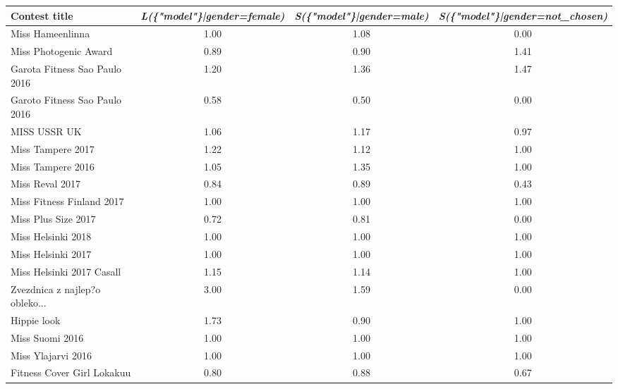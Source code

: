 \documentclass[english]{tktltiki}
\begin{document}
\begin{table}[H]
    \centering
    \begin{adjustbox}{width=1\textwidth}
    \begin{tabular}{lccc}
        \toprule
        \textbf{Contest title} & \textbf{\emph{L(\{"model"\}|gender=female)}} & \textbf{\emph{S(\{"model"\}|gender=male)}} & \textbf{\emph{S(\{"model"\}|gender=not\_chosen)}} \\
        \midrule
                                  Miss Hameenlinna &  1.00 &  1.08 &    0.00 \\
                             Miss Photogenic Award &  0.89 &  0.90 &    1.41 \\
                     Garota Fitness Sao Paulo 2016 &  1.20 &  1.36 &    1.47 \\
                     Garoto Fitness Sao Paulo 2016 &  0.58 &  0.50 &    0.00 \\
                                      MISS USSR UK &  1.06 &  1.17 &    0.97 \\
                                 Miss Tampere 2017 &  1.22 &  1.12 &    1.00 \\
                                 Miss Tampere 2016 &  1.05 &  1.35 &    1.00 \\
                                   Miss Reval 2017 &  0.84 &  0.89 &    0.43 \\
                         Miss Fitness Finland 2017 &  1.00 &  1.00 &    1.00 \\
                               Miss Plus Size 2017 &  0.72 &  0.81 &    0.00 \\
                                Miss Helsinki 2018 &  1.00 &  1.00 &    1.00 \\
                                Miss Helsinki 2017 &  1.00 &  1.00 &    1.00 \\
                         Miss Helsinki 2017 Casall &  1.15 &  1.14 &    1.00 \\
                Zvezdnica z najlep?o obleko... &  3.00 &  1.59 &    0.00 \\
                                       Hippie look &  1.73 &  0.90 &    1.00 \\
                                   Miss Suomi 2016 &  1.00 &  1.00 &    1.00 \\
                                Miss Ylajarvi 2016 &  1.00 &  1.00 &    1.00 \\
                        Fitness Cover Girl Lokakuu &  0.80 &  0.88 &    0.67 \\

\end{tabular}
\end{adjustbox}
\end{table}
\end{document}
